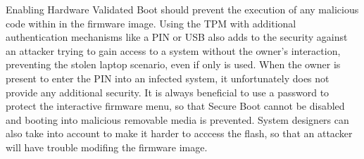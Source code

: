 Enabling Hardware Validated Boot should prevent the execution of any malicious code within in the firmware image.
Using the \ac{TPM} with additional authentication mechanisms like a \ac{PIN} or \ac{USB} also adds to the security against an attacker trying to gain access to a system without the owner's interaction, preventing the stolen laptop scenario, even if only \hyperref[tab:pcr-usage]{} is used.
When the owner is present to enter the \ac{PIN} into an infected system, it unfortunately does not provide any additional security.
It is always beneficial to use a password to protect the interactive firmware menu, so that Secure Boot cannot be disabled and booting into malicious removable media is prevented.
System designers can also take into account to make it harder to acccess the flash, so that an attacker will have trouble modifing the firmware image.